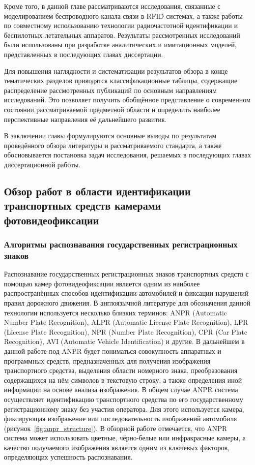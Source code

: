 \documentclass[12pt]{article}
\theoremstyle{definition}
\begin{document}
Кроме того, в данной главе рассматриваются исследования, связанные с моделированием беспроводного канала связи в RFID системах, а также работы по совместному использованию технологии радиочастотной идентификации и беспилотных летательных аппаратов. Результаты рассмотренных исследований были использованы при разработке аналитических и имитационных моделей, представленных в последующих главах диссертации.

Для повышения наглядности и систематизации результатов обзора в конце тематических разделов приводятся классификационные таблицы, содержащие распределение рассмотренных публикаций по основным направлениям исследований. Это позволяет получить обобщённое представление о современном состоянии рассматриваемой предметной области и определить наиболее перспективные направления её дальнейшего развития.

В заключении главы формулируются основные выводы по результатам проведённого обзора литературы и рассматриваемого стандарта, а также обосновывается постановка задач исследования, решаемых в последующих главах диссертационной работы.

\subsection{Обзор работ в области идентификации транспортных средств камерами фотовидеофиксации}
\label{sec:ch11}

\subsubsection{Алгоритмы распознавания государственных регистрационных знаков}

Распознавание государственных регистрационных знаков транспортных средств с помощью камер фотовидеофиксации является одним из наиболее распространённых способов идентификации автомобилей и фиксации нарушений правил дорожного движения. В англоязычной литературе для обозначения данной технологии используется несколько близких терминов: ANPR (Automatic Number Plate Recognition), ALPR (Automatic License Plate Recognition), LPR (License Plate Recognition), NPR (Number Plate Recognition), CPR (Car Plate Recognition), AVI (Automatic Vehicle Identification) и другие. В дальнейшем в данной работе под ANPR будет пониматься совокупность аппаратных и программных средств, предназначенных для получения изображения транспортного средства, выделения области номерного знака, преобразования содержащихся на нём символов в текстовую строку, а также определения иной информации на основе анализа изображения. В общем случае ANPR система осуществляет идентификацию транспортного средства по его государственному регистрационному знаку без участия оператора. Для этого используется камера, фиксирующая изображение или последовательность изображений автомобиля (рисунок~\ref{fig:anpr_structure}). В обзорной работе \cite{ANPR12} отмечается, что ANPR система может использовать цветные, чёрно-белые или инфракрасные камеры, а качество получаемого изображения является одним из ключевых факторов, определяющих успешность распознавания.
\end{document}
